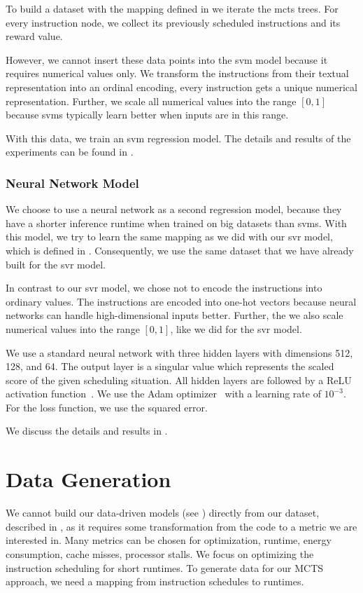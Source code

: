 To build a dataset with the mapping defined in  we iterate the \ac{mcts} trees.
For every instruction node, we collect its previously scheduled instructions and its reward value.

However, we cannot insert these data points into the \ac{svm} model because it requires numerical values only.
We transform the instructions from their textual representation into an ordinal encoding, \ie every instruction gets a unique numerical representation.
Further, we scale all numerical values into the range $[0,1]$ because \acp{svm} typically learn better when inputs are in this range.

With this data, we train an \ac{svm} regression model.
The details and results of the experiments can be found in .

\subsubsection{Neural Network Model}
We choose to use a neural network as a second regression model, because they have a shorter inference runtime when trained on big datasets than \acp{svm}.
With this model, we try to learn the same mapping as we did with our \ac{svr} model, which is defined in .
Consequently, we use the same dataset that we have already built for the \ac{svr} model.

In contrast to our \ac{svr} model, we chose not to encode the instructions into ordinary values.
The instructions are encoded into one-hot vectors because neural networks can handle high-dimensional inputs better.
Further, the we also scale numerical values into the range $[0,1]$, like we did for the \ac{svr} model.

We use a standard neural network with three hidden layers with dimensions 512, 128, and 64.
The output layer is a singular value which represents the scaled score of the given scheduling situation.
All hidden layers are followed by a ReLU activation function~\cite{nair2010rectified}.
We use the Adam optimizer~\cite{kingma2014adam} with a learning rate of $10^{-3}$.
For the loss function, we use the squared error.

We discuss the details and results in .

\section{Data Generation}
We cannot build our data-driven models (see ) directly from our dataset, described in , as it requires some transformation from the code to a metric we are interested in.
Many metrics can be chosen for optimization, \eg runtime, energy consumption, cache misses, processor stalls.
We focus on optimizing the instruction scheduling for short runtimes.
To generate data for our MCTS approach, we need a mapping from instruction schedules to runtimes.

